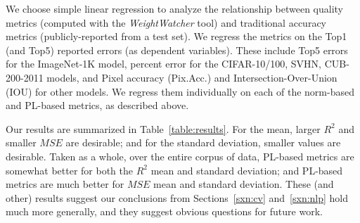 We choose simple linear regression to analyze the relationship between quality metrics (computed with the \emph{WeightWatcher} tool) 
and traditional accuracy metrics (publicly-reported from a test set).
We regress the metrics on the Top1 (and Top5) reported errors (as dependent variables).
These include Top5 errors for the ImageNet-1K model, percent error for the CIFAR-10/100, SVHN, CUB-200-2011 models, and Pixel accuracy
(Pix.Acc.) and Intersection-Over-Union (IOU) for other models.
We regress them individually on each of the norm-based and PL-based metrics, as described above.

Our results are summarized in Table~\ref{table:results}.
For the mean, larger $R^{2}$ and smaller $MSE$ are desirable; and for the standard deviation, smaller values are desirable.
Taken as a whole, over the entire corpus of data, PL-based metrics are somewhat better for both the $R^{2}$ mean and standard deviation;
and PL-based metrics are much better for $MSE$ mean and standard deviation.
These (and other) results suggest our conclusions from Sections~\ref{sxn:cv} and~\ref{sxn:nlp} hold much more generally, and they suggest
obvious questions for future work.

